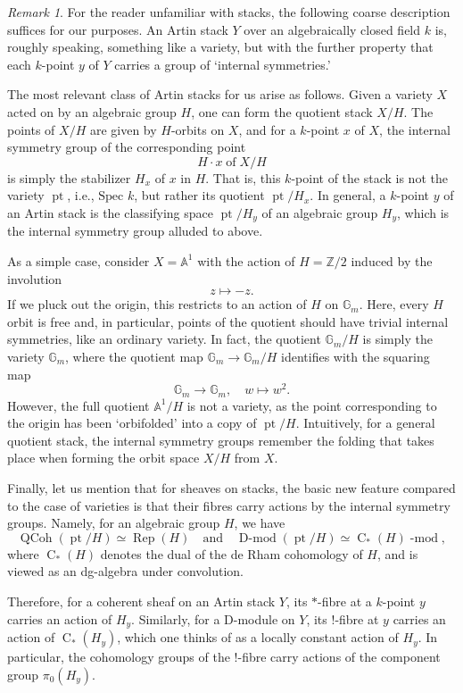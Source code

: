\documentclass[10pt]{amsart}
\newcommand{\pt}{\on{pt}}
\newcommand{\on}{\operatorname}
\renewcommand{\mod}{\on{-mod}}
\newcommand{\Dmod}{\on{D-mod}}
\theoremstyle{remark}
\newtheorem{re}[subsubsection]{Remark}
\newcommand{\Spec}{\text{Spec }}
\numberwithin{equation}{section}
\renewcommand{\mod}{\operatorname{-mod}}
\newcommand{\QCoh}{\on{QCoh}}
\begin{document}
	\begin{re} \label{r:introstacks}For the reader unfamiliar with stacks, the following coarse description suffices for our purposes. An Artin stack $Y$ over an algebraically closed field $k$ is, roughly speaking, something like a variety, but with the further property that each $k$-point $y$ of $Y$  carries a group of `internal symmetries.'
	
		The most relevant class of Artin stacks for us arise as follows.  Given a variety $X$ acted on by an algebraic group $H$, one can form the quotient stack $X/H$. The points of $X/H$ are given by $H$-orbits on $X$, and for a $k$-point $x$ of  $X$, the internal symmetry group of the corresponding point $$H \cdot x \mathrm{\phantom{i}  of \phantom{i} } X/H$$is simply the stabilizer $H_x$ of $x$ in $H$. That is, this $k$-point of the stack is not the variety $\pt$, i.e.,   $\Spec k$, but rather its quotient $\pt / H_x$. In general, a $k$-point $y$ of an Artin stack is the classifying space $\pt / H_y$ of an algebraic group $H_y$, which is the internal symmetry group alluded to above. 
	
		
		As a simple case, consider $X = \mathbb{A}^1$ with the  action of $H = \mathbb{Z}/2$ induced by the involution  $$z \mapsto -z.$$ If we pluck out the origin, this restricts to an action of $H$ on $\mathbb{G}_m$. Here, every $H$ orbit is free and, in particular, points of the quotient should have trivial internal symmetries, like an ordinary variety. In fact, the quotient $\mathbb{G}_m / H$ is simply the variety $\mathbb{G}_m$, where the quotient map 
		$
		   \mathbb{G}_m \rightarrow \mathbb{G}_m / H
		$
		identifies with the squaring map  $$\mathbb{G}_m \rightarrow \mathbb{G}_m, \quad w \mapsto w^2.$$ 
		However, the full quotient $\mathbb{A}^1 / H$ is not a variety, as the point corresponding to the origin has been `orbifolded' into a copy of $\pt / H$. Intuitively, for a general quotient stack, the internal symmetry groups remember the folding that takes place when forming the orbit space $X/H$ from $X$. 
		
		
		 Finally, let us mention that for sheaves on stacks, the basic new feature compared to the case of varieties is that their fibres carry actions by the internal symmetry groups. Namely, for an algebraic group $H$, we have 
		 \[
		   \QCoh( \pt / H) \simeq \on{Rep}(H) \quad \text{and} \quad \Dmod( \pt / H) \simeq \on{C}_*(H)\mod, 
		 \]
		 where $\on{C}_*(H)$ denotes the dual of the de Rham cohomology of $H$, and is viewed as an dg-algebra under convolution. 
		 
		 Therefore, for a coherent sheaf on an Artin stack $Y$, its $*$-fibre at a $k$-point $y$ carries an action of $H_y$. Similarly, for a D-module on $Y$, its $!$-fibre at $y$ carries an action of $\on{C}_*(H_y)$, which one thinks of as a locally constant action of $H_y$. In particular, the cohomology groups of the $!$-fibre carry actions of the component group $\pi_0(H_y)$. 
	\end{re}
	
\end{document}
